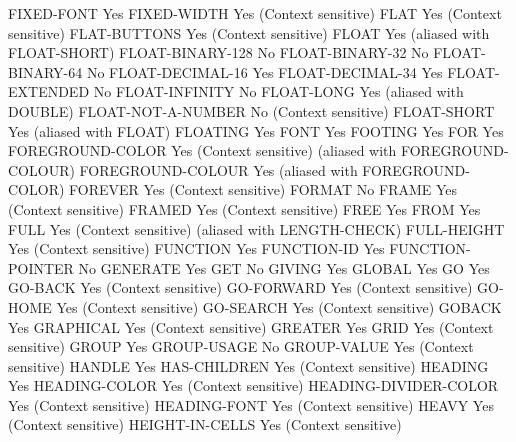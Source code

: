 FIXED-FONT                      Yes
FIXED-WIDTH                     Yes (Context sensitive)
FLAT                            Yes (Context sensitive)
FLAT-BUTTONS                    Yes (Context sensitive)
FLOAT                           Yes (aliased with FLOAT-SHORT)
FLOAT-BINARY-128                No
FLOAT-BINARY-32                 No
FLOAT-BINARY-64                 No
FLOAT-DECIMAL-16                Yes
FLOAT-DECIMAL-34                Yes
FLOAT-EXTENDED                  No
FLOAT-INFINITY                  No
FLOAT-LONG                      Yes (aliased with DOUBLE)
FLOAT-NOT-A-NUMBER              No (Context sensitive)
FLOAT-SHORT                     Yes (aliased with FLOAT)
FLOATING                        Yes
FONT                            Yes
FOOTING                         Yes
FOR                             Yes
FOREGROUND-COLOR                Yes (Context sensitive) (aliased with FOREGROUND-COLOUR)
FOREGROUND-COLOUR               Yes (aliased with FOREGROUND-COLOR)
FOREVER                         Yes (Context sensitive)
FORMAT                          No
FRAME                           Yes (Context sensitive)
FRAMED                          Yes (Context sensitive)
FREE                            Yes
FROM                            Yes
FULL                            Yes (Context sensitive) (aliased with LENGTH-CHECK)
FULL-HEIGHT                     Yes (Context sensitive)
FUNCTION                        Yes
FUNCTION-ID                     Yes
FUNCTION-POINTER                No
GENERATE                        Yes
GET                             No
GIVING                          Yes
GLOBAL                          Yes
GO                              Yes
GO-BACK                         Yes (Context sensitive)
GO-FORWARD                      Yes (Context sensitive)
GO-HOME                         Yes (Context sensitive)
GO-SEARCH                       Yes (Context sensitive)
GOBACK                          Yes
GRAPHICAL                       Yes (Context sensitive)
GREATER                         Yes
GRID                            Yes (Context sensitive)
GROUP                           Yes
GROUP-USAGE                     No
GROUP-VALUE                     Yes (Context sensitive)
HANDLE                          Yes
HAS-CHILDREN                    Yes (Context sensitive)
HEADING                         Yes
HEADING-COLOR                   Yes (Context sensitive)
HEADING-DIVIDER-COLOR           Yes (Context sensitive)
HEADING-FONT                    Yes (Context sensitive)
HEAVY                           Yes (Context sensitive)
HEIGHT-IN-CELLS                 Yes (Context sensitive)
